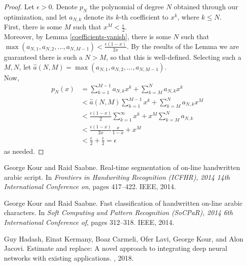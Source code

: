 \documentclass{article}
\theoremstyle{definition}
\theoremstyle{remark}
\numberwithin{equation}{section}
\begin{document}
\begin{proof}
Let $\epsilon > 0$. Denote $p_N$ the polynomial of degree $N$ obtained through our optimization, and let $a_{N,k}$ denote its $k$-th coefficient to $x^k$, where $k \le N$.\\
First, there is some $M$ such that $x^M < \frac{\epsilon}{2}$. \\
Moreover, by Lemma \ref{coefficients-vanish}, there is some $N$ such that $\max (a_{N,1}, a_{N,2},..., a_{N,M-1}) < \frac{\epsilon(1-x)}{2x}$. By the results of the Lemma we are guaranteed there is such a $N>M$, so that this is well-defined. Selecting such a $M, N$, let $\hat{a}(N,M) = \max (a_{N,1}, a_{N,2},..., a_{N,M-1}) $.\\
Now,
\begin{align*}
p_N(x) &= \sum_{k=1}^{M-1} a_{N,k} x^k + \sum_{k=M}^N a_{N,k}x ^k\\
&< \hat{a}(N,M) \sum_{k=1}^{M-1} x^ k + \sum_{k=M}^N a_{N,k} x^M \\
&< \frac{\epsilon(1-x)}{2} \sum_{k=1}^\infty x^k + x^M \sum_{k=M}^N a_{N,k}\\
& < \frac{\epsilon(1-x)}{2x} \frac{x}{1-x} + x^M \\
&< \frac{\epsilon}{2} + \frac{\epsilon}{2} = \epsilon
\end{align*}
as needed.
\end{proof}


  


\begin{thebibliography}{1}

George Kour and Raid Saabne.
\newblock Real-time segmentation of on-line handwritten arabic script.
\newblock In {\em Frontiers in Handwriting Recognition (ICFHR), 2014 14th
  International Conference on}, pages 417--422. IEEE, 2014.

George Kour and Raid Saabne.
\newblock Fast classification of handwritten on-line arabic characters.
\newblock In {\em Soft Computing and Pattern Recognition (SoCPaR), 2014 6th
  International Conference of}, pages 312--318. IEEE, 2014.

Guy Hadash, Einat Kermany, Boaz Carmeli, Ofer Lavi, George Kour, and Alon
  Jacovi.
\newblock Estimate and replace: A novel approach to integrating deep neural
  networks with existing applications.
, 2018.

\end{thebibliography}
\end{document}
